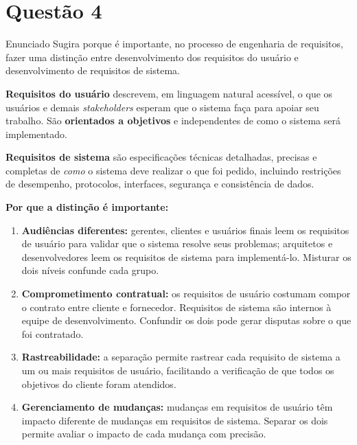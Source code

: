 \documentclass[12pt,a4paper]{article}
\begin{document}
\section*{Questão 4}

\begin{questao}{Enunciado}
Sugira porque é importante, no processo de engenharia de requisitos, fazer
uma distinção entre desenvolvimento dos requisitos do usuário e
desenvolvimento de requisitos de sistema.
\end{questao}

\begin{resposta}

\textbf{Requisitos do usuário} descrevem, em linguagem natural acessível, o que
os usuários e demais \textit{stakeholders} esperam que o sistema faça para apoiar
seu trabalho. São \textbf{orientados a objetivos} e independentes de como o sistema
será implementado.

\textbf{Requisitos de sistema} são especificações técnicas detalhadas, precisas e
completas de \emph{como} o sistema deve realizar o que foi pedido, incluindo
restrições de desempenho, protocolos, interfaces, segurança e consistência de dados.

\textbf{Por que a distinção é importante:}

\begin{enumerate}
  \item \textbf{Audiências diferentes:} gerentes, clientes e usuários finais leem
        os requisitos de usuário para validar que o sistema resolve seus problemas;
        arquitetos e desenvolvedores leem os requisitos de sistema para implementá-lo.
        Misturar os dois níveis confunde cada grupo.

  \item \textbf{Comprometimento contratual:} os requisitos de usuário costumam
        compor o contrato entre cliente e fornecedor. Requisitos de sistema são
        internos à equipe de desenvolvimento. Confundir os dois pode gerar disputas
        sobre o que foi contratado.

  \item \textbf{Rastreabilidade:} a separação permite rastrear cada requisito de
        sistema a um ou mais requisitos de usuário, facilitando a verificação de
        que todos os objetivos do cliente foram atendidos.

  \item \textbf{Gerenciamento de mudanças:} mudanças em requisitos de usuário têm
        impacto diferente de mudanças em requisitos de sistema. Separar os dois
        permite avaliar o impacto de cada mudança com precisão.


\end{enumerate}
\end{resposta}
\end{document}
